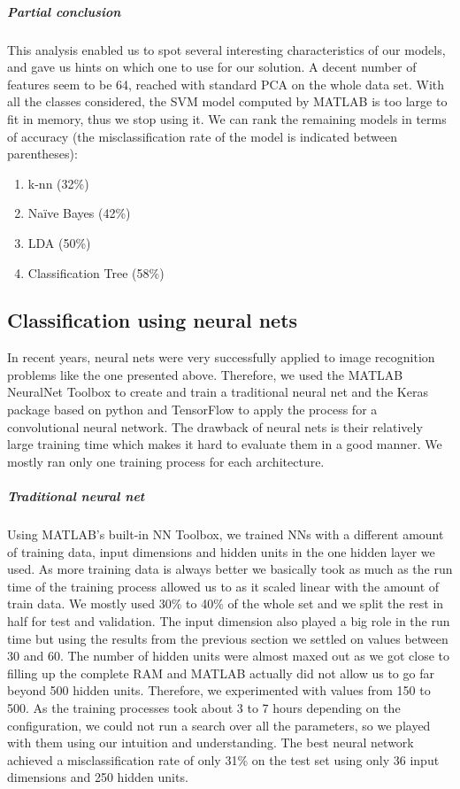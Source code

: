 \documentclass[twocolumn]{article}%
\begin{document}
	\subparagraph{Partial conclusion}
	This analysis enabled us to spot several interesting characteristics of our models, and gave us hints on which one to use for our solution. A decent number of features seem to be 64, reached with standard PCA on the whole data set. With all the classes considered, the SVM model computed by MATLAB is too large to fit in memory, thus we stop using it. We can rank the remaining models in terms of accuracy (the misclassification rate of the model is indicated between parentheses):
	\begin{enumerate}
	\item k-nn (32\%)
	\item Naïve Bayes (42\%)
	\item LDA (50\%)
	\item Classification Tree (58\%)
	\end{enumerate}
	
	
	\subsection{Classification using neural nets}	
	
	In recent years, neural nets were very successfully applied to image recognition problems like the one presented above. Therefore, we used the MATLAB NeuralNet Toolbox to create and train a traditional neural net and the Keras package based on python and TensorFlow to apply the process for a convolutional neural network. The drawback of neural nets is their relatively large training time which makes it hard to evaluate them in a good manner. We mostly ran only one training process for each architecture.
	
	\subparagraph{Traditional neural net}
	Using MATLAB's built-in NN Toolbox, we trained NNs with a different amount of training data, input dimensions and hidden units in the one hidden layer we used. As more training data is always better we basically took as much as the run time of the training process allowed us to as it scaled linear with the amount of train data. We mostly used 30\% to 40\% of the whole set and we split the rest in half for test and validation. The input dimension also played a big role in the run time but using the results from the previous section we settled on values between 30 and 60. The number of hidden units were almost maxed out as we got close to filling up the complete RAM and MATLAB actually did not allow us to go far beyond 500 hidden units. Therefore, we  experimented with values from 150 to 500. As the training processes took about 3 to 7 hours depending on the configuration, we could not run a search over all the parameters, so we played with them using our intuition and understanding. The best neural network achieved a misclassification rate of only 31\% on the test set using only 36 input dimensions and 250 hidden units.
	
\end{document}
